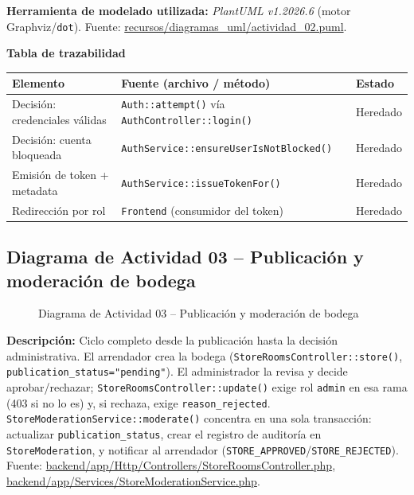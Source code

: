 \bigskip
{\sloppy\noindent\textbf{Herramienta de modelado utilizada:} \textit{PlantUML v1.2026.6} (motor Graphviz/\texttt{dot}). Fuente: \url{recursos/diagramas_uml/actividad_02.puml}.\par}

\bigskip
\noindent\textbf{Tabla de trazabilidad}
\begin{longtable}{|L{4cm}|L{7.5cm}|M{2.3cm}|}
\hline
{} \textbf{Elemento} & \textbf{Fuente (archivo / método)} & \textbf{Estado} \\ \hline
\endhead
Decisión: credenciales válidas & \texttt{Auth::attempt()} vía \texttt{AuthController::login()} & Heredado \\ \hline
Decisión: cuenta bloqueada & \texttt{AuthService::ensureUserIsNotBlocked()} & Heredado \\ \hline
Emisión de token + metadata & \texttt{AuthService::issueTokenFor()} & Heredado \\ \hline
Redirección por rol & \texttt{Frontend} (consumidor del token) & Heredado \\ \hline
\end{longtable}
\clearpage

\subsection{Diagrama de Actividad 03 -- Publicación y moderación de bodega}
\begin{figure}[H]
    \centering
    \caption{Diagrama de Actividad 03 -- Publicación y moderación de bodega}
    \label{fig:actividad03}
\end{figure}

{\sloppy\noindent\textbf{Descripción:} Ciclo completo desde la publicación hasta la decisión administrativa. El arrendador crea la bodega (\texttt{StoreRoomsController::store()}, \texttt{publication\_status="pending"}). El administrador la revisa y decide aprobar/rechazar; \texttt{StoreRoomsController::update()} exige rol \texttt{admin} en esa rama (403 si no lo es) y, si rechaza, exige \texttt{reason\_rejected}. \texttt{StoreModerationService::moderate()} concentra en una sola transacción: actualizar \texttt{publication\_status}, crear el registro de auditoría en \texttt{StoreModeration}, y notificar al arrendador (\texttt{STORE\_APPROVED}/\texttt{STORE\_REJECTED}). Fuente: \url{backend/app/Http/Controllers/StoreRoomsController.php}, \url{backend/app/Services/StoreModerationService.php}.\par}

